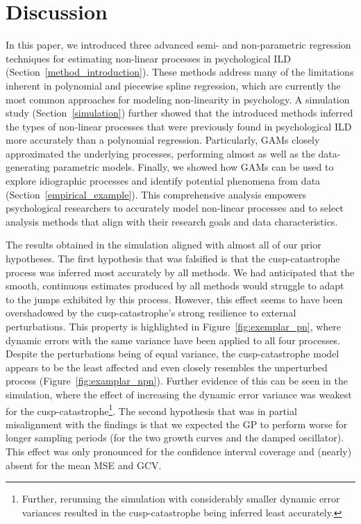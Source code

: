 \documentclass[man, floatsintext]{apa7}
\begin{document}
\section{Discussion}

In this paper, we introduced three advanced semi- and non-parametric regression
techniques for estimating non-linear processes in psychological ILD
(Section~\ref{method_introduction}). These methods address many of the
limitations inherent in polynomial and piecewise spline regression, which are
currently the most common approaches for modeling non-linearity in psychology.
A simulation study (Section~\ref{simulation}) further showed that the
introduced methods inferred the types of non-linear processes that were
previously found in psychological ILD more accurately than a polynomial
regression. Particularly, GAMs closely approximated the underlying processes,
performing almost as well as the data-generating parametric models. Finally, we
showed how GAMs can be used to explore idiographic processes and identify
potential phenomena from data (Section~\ref{empirical_example}). This
comprehensive analysis empowers psychological researchers to accurately model
non-linear processes and to select analysis methods that align with their
research goals and data characteristics.

The results obtained in the simulation aligned with almost all of our prior
hypotheses. The first hypothesis that was falsified is that the
cusp-catastrophe process was inferred most accurately by all methods. We had
anticipated that the smooth, continuous estimates produced by all methods would
struggle to adapt to the jumps exhibited by this process. However, this effect
seems to have been overshadowed by the cusp-catastrophe's strong resilience to
external perturbations. This property is highlighted in
Figure~\ref{fig:exemplar_pn}, where dynamic errors with the same variance have
been applied to all four processes. Despite the perturbations being of equal
variance, the cusp-catastrophe model appears to be the least affected and even
closely resembles the unperturbed process (Figure~\ref{fig:examplar_npn}).
Further evidence of this can be seen in the simulation, where the effect of
increasing the dynamic error variance was weakest for the
cusp-catastrophe\footnote{Further, rerunning the simulation with considerably
  smaller dynamic error variances resulted in the cusp-catastrophe being
  inferred
  least accurately.}. The second hypothesis that was in partial misalignment
with
the findings is that we expected the GP to perform worse for longer sampling
periods (for the two growth curves and the damped oscillator). This effect was
only pronounced for the confidence interval coverage and (nearly) absent for
the mean MSE and GCV\@.
\end{document}

